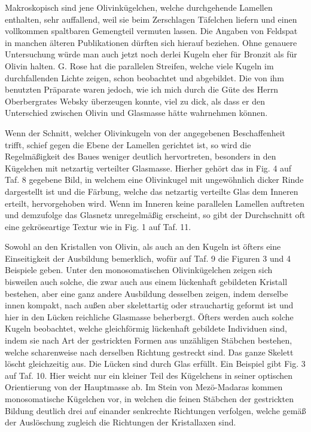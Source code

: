 \documentclass[a4paper, 12pt, oneside]{article}
\begin{document}
Makroskopisch sind jene Olivinkügelchen, welche durchgehende Lamellen enthalten, sehr auffallend, weil sie beim Zerschlagen Täfelchen liefern und einen vollkommen spaltbaren Gemengteil vermuten lassen. Die Angaben von Feldspat in manchen älteren Publikationen dürften sich hierauf beziehen. Ohne genauere Untersuchung würde man auch jetzt noch derlei Kugeln eher für Bronzit als für Olivin halten. G. Rose hat die parallelen Streifen, welche viele Kugeln im durchfallenden Lichte zeigen, schon beobachtet und abgebildet. Die von ihm benutzten Präparate waren jedoch, wie ich mich durch die Güte des Herrn Oberbergrates Websky überzeugen konnte, viel zu dick, als dass er den Unterschied zwischen Olivin und Glasmasse hätte wahrnehmen können.

Wenn der Schnitt, welcher Olivinkugeln von der angegebenen Beschaffenheit trifft, schief gegen die Ebene der Lamellen gerichtet ist, so wird die Regelmäßigkeit des Baues weniger deutlich hervortreten, besonders in den Kügelchen mit netzartig verteilter Glasmasse. Hierher gehört das in Fig. 4 auf Taf. 8 gegebene Bild, in welchem eine Olivinkugel mit ungewöhnlich dicker Rinde dargestellt ist und die Färbung, welche das netzartig verteilte Glas dem Inneren erteilt, hervorgehoben wird. Wenn im Inneren keine parallelen Lamellen auftreten und demzufolge das Glasnetz unregelmäßig erscheint, so gibt der Durchschnitt oft eine gekröseartige Textur wie in Fig. 1 auf Taf. 11.

Sowohl an den Kristallen von Olivin, als auch an den Kugeln ist öfters eine Einseitigkeit der Ausbildung bemerklich, wofür auf Taf. 9 die Figuren 3 und 4 Beispiele geben. Unter den monosomatischen Olivinkügelchen zeigen sich bisweilen auch solche, die zwar auch aus einem lückenhaft gebildeten Kristall bestehen, aber eine ganz andere Ausbildung desselben zeigen, indem derselbe innen kompakt, nach außen aber skelettartig oder strauchartig geformt ist und hier in den Lücken reichliche Glasmasse beherbergt. Öfters werden auch solche Kugeln beobachtet, welche gleichförmig lückenhaft gebildete Individuen sind, indem sie nach Art der gestrickten Formen aus unzähligen Stäbchen bestehen, welche scharenweise nach derselben Richtung gestreckt sind. Das ganze Skelett löscht gleichzeitig aus. Die Lücken sind durch Glas erfüllt. Ein Beispiel gibt Fig. 3 auf Taf. 10. Hier weicht nur ein kleiner Teil des Kügelchens in seiner optischen Orientierung von der Hauptmasse ab. Im Stein von Mezö-Madaras kommen monosomatische Kügelchen vor, in welchen die feinen Stäbchen der gestrickten Bildung deutlich drei auf einander senkrechte Richtungen verfolgen, welche gemäß der Auslöschung zugleich die Richtungen der Kristallaxen sind.
\end{document}
